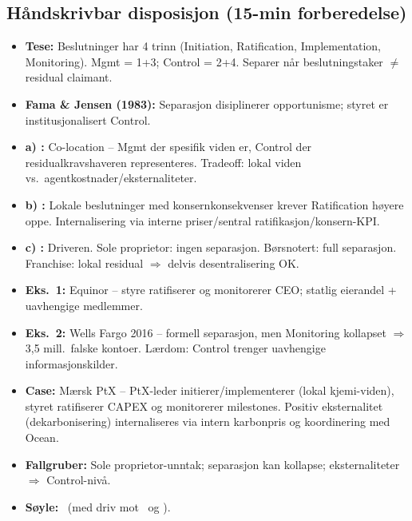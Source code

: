 \subsection*{Håndskrivbar disposisjon (15-min forberedelse)}
\begin{itemize}\setlength{\itemsep}{2pt}
\item \textbf{Tese:} Beslutninger har 4 trinn (Initiation, Ratification, Implementation, Monitoring). Mgmt = 1+3; Control = 2+4. Separer når beslutningstaker $\neq$ residual claimant.
\item \textbf{Fama \& Jensen (1983):} Separasjon disiplinerer opportunisme; styret er institusjonalisert Control.
\item \textbf{a) :} Co-location -- Mgmt der spesifik viden er, Control der residualkravshaveren representeres. Tradeoff: lokal viden vs.\ agentkostnader/eksternaliteter.
\item \textbf{b) :} Lokale beslutninger med konsernkonsekvenser krever Ratification høyere oppe. Internalisering via interne priser/sentral ratifikasjon/konsern-KPI.
\item \textbf{c) :} Driveren. Sole proprietor: ingen separasjon. Børsnotert: full separasjon. Franchise: lokal residual $\Rightarrow$ delvis desentralisering OK.
\item \textbf{Eks.\ 1:} Equinor -- styre ratifiserer og monitorerer CEO; statlig eierandel + uavhengige medlemmer.
\item \textbf{Eks.\ 2:} Wells Fargo 2016 -- formell separasjon, men Monitoring kollapset $\Rightarrow$ 3,5 mill.\ falske kontoer. Lærdom: Control trenger uavhengige informasjonskilder.
\item \textbf{Case:} Mærsk PtX -- PtX-leder initierer/implementerer (lokal kjemi-viden), styret ratifiserer CAPEX og monitorerer milestones. Positiv eksternalitet (dekarbonisering) internaliseres via intern karbonpris og koordinering med Ocean.
\item \textbf{Fallgruber:} Sole proprietor-unntak; separasjon kan kollapse; eksternaliteter $\Rightarrow$ Control-nivå.
\item \textbf{Søyle:} \SOne\ (med driv mot \STwo\ og \SThree).
\end{itemize}
